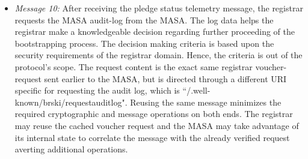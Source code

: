 \begin{itemize}
	\item \textit{Message 10:} After receiving the pledge status telemetry message, the registrar requests the MASA audit-log from the MASA. The log data helps the registrar make a knowledgeable decision regarding further proceeding of the bootstrapping process. The decision making criteria is based upon the security requirements of the registrar domain. Hence, the criteria is out of the protocol's scope.
	The request content is the exact same registrar voucher-request sent earlier to the MASA, but is directed through a different URI specific for requesting the audit log, which is ``/.well-known/brski/requestauditlog". Reusing the same message minimizes the required cryptographic and message operations on both ends. The registrar may reuse the cached voucher request and the MASA may take advantage of its internal state to correlate the message with the already verified request averting additional operations.
	

\end{itemize}
